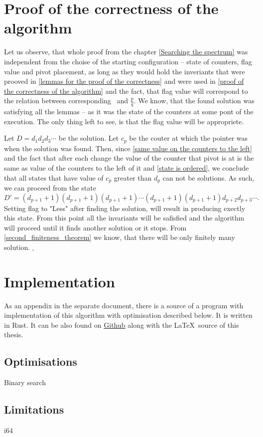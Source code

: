 \section{Proof of the correctness of the algorithm}
Let us observe, that whole proof from the chapter \ref{Searching the spectrum} 
was independent from the choise of 
the starting configuration -- state of counters, flag value and pivot placement, as 
long as they would hold the inveriants that were prooved in 
\ref{lemmas for the proof of the correctness} and were used in 
\ref{proof of the correctness of the algorithm} and the fact, that flag value will 
correspond to the relation between corresponding \Eoc\ and $\frac{p}{q}$. 
We know, that the found solution was satisfying all the lemmas -- as it was the state of 
the counters at some pont of the execution. The only thing left to see, is that 
the flag value will be appropriete. 

Let $D = d_1d_2d_3\cdots$ be the solution. 
Let $c_p$ be the couter at which the pointer was when the solution was found. Then, since 
\ref{same value on the counters to the left} and the fact that after each change the value of 
the counter that pivot is at is the same as value of the counters to the left of it 
and \ref{state is ordered}, we conclude 
that 
all states that have value of $c_p$ greater than $d_p$ can not be solutions. 
As such, we can proceed from the state 
\begin{equation}
D' = (d_{p+1}+1)(d_{p+1}+1)(d_{p+1}+1)\cdots (d_{p+1}+1)(d_{p+1}+1)d_{p+2}d_{p+3}\cdots.
\end{equation}
Setting flag to "Less" after finding the solution, will result in producing exectly this state. 
From this point all the invariants will be safisfied and the algorithm will proceed 
until it finds another solution or it stops. 
From \ref{second_finiteness_theorem} we know, that there will be only finitely many 
solution.
$_\square$

\section{Implementation}\label{implementation}
As an appendix in the separate document, there is a source of a program with implementation 
of this algorithm with optimisation described below.
It is written in Rust. 
It can be also found on 
\href{https://github.com/Sooyka/praca_magisterska_orbifoldy}{Github}
along with the \LaTeX\ source of 
this thesis.

\subsection{Optimisations}
Binary search

\subsection{Limitations}
i64


